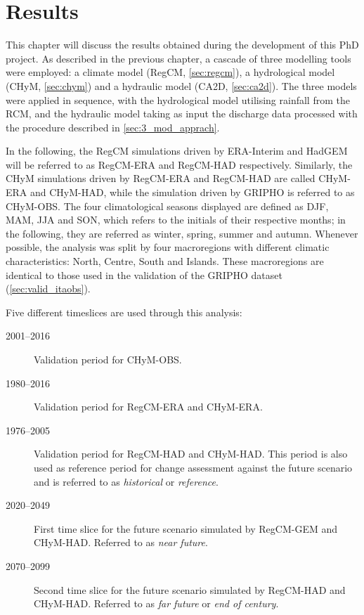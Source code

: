 \chapter{Results}\label{chp:results}
This chapter will discuss the results obtained during the development of this PhD project.
As described in the previous chapter, a cascade of three modelling tools were employed: a climate model (RegCM, \cref{sec:regcm}), a hydrological model (CHyM, \cref{sec:chym}) and a hydraulic model (CA2D, \cref{sec:ca2d}).
The three models were applied in sequence, with the hydrological model utilising rainfall from the RCM, and the hydraulic model taking as input the discharge data processed with the procedure described in \cref{sec:3_mod_apprach}.

In the following, the RegCM simulations driven by ERA-Interim and HadGEM will be referred to as RegCM-ERA and RegCM-HAD respectively.
Similarly, the CHyM simulations driven by RegCM-ERA and RegCM-HAD are called CHyM-ERA and CHyM-HAD, while the simulation driven by GRIPHO is referred to as CHyM-OBS.
The four climatological seasons displayed are defined as DJF, MAM, JJA and SON, which refers to the initials of their respective months; in the following, they are referred as winter, spring, summer and autumn.
Whenever possible, the analysis was split by four macroregions with different climatic characteristics: North, Centre, South and Islands. These macroregions are identical to those used in the validation of the GRIPHO dataset (\cref{sec:valid_itaobs}).

Five different timeslices are used through this analysis:
\begin{description}
    \item[2001--2016] Validation period for CHyM-OBS.
    \item[1980--2016] Validation period for RegCM-ERA and CHyM-ERA.
    \item[1976--2005] Validation period for RegCM-HAD and CHyM-HAD. This period is also used as reference period for change assessment against the future scenario and is referred to as \emph{historical} or \emph{reference}.
    \item[2020--2049] First time slice for the future scenario simulated by RegCM-GEM and CHyM-HAD. Referred to as \emph{near future}.
    \item[2070--2099] Second time slice for the future scenario simulated by RegCM-HAD and CHyM-HAD. Referred to as \emph{far future} or \emph{end of century}.
\end{description}

